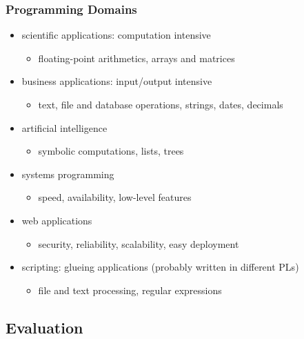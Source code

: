 \documentclass[dvipsnames]{beamer}
\theoremstyle{plain}
\begin{document}
\begin{frame}
  \frametitle{Programming Domains}

  \begin{itemize}
    \item scientific applications: computation intensive
    \begin{itemize}
      \item floating-point arithmetics, arrays and matrices
    \end{itemize}

    \item business applications: input/output intensive
    \begin{itemize}
      \item text, file and database operations, strings, dates, decimals
    \end{itemize}

    \item artificial intelligence
    \begin{itemize}
      \item symbolic computations, lists, trees
    \end{itemize}

    \item systems programming
    \begin{itemize}
      \item speed, availability, low-level features
    \end{itemize}

    \item web applications
    \begin{itemize}
      \item security, reliability, scalability, easy deployment
    \end{itemize}

    \item scripting: glueing applications (probably written in different PLs)
    \begin{itemize}
      \item file and text processing, regular expressions
    \end{itemize}
  \end{itemize}
\end{frame}

\subsection{Evaluation}
\end{document}

